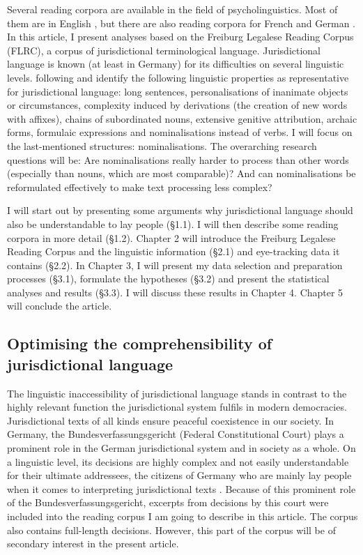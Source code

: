 \documentclass[output=paper]{langsci/langscibook}
\begin{document}
Several reading corpora are available in the field of psycholinguistics. Most of them are in English \citep{Frank2013, Kennedy2003}, but there are also reading corpora for French \citep{Kennedy2003} and German \citep{Kliegl2004, wolfer2013}. In this article, I present analyses based on the Freiburg Legalese Reading Corpus (FLRC), a corpus of jurisdictional terminological language. Jurisdictional language is known (at least in Germany) for its difficulties on several linguistic levels. \citet[170]{HansenSchirra2004} following \citet{Oksaar1988} and \citet{Wagner1981} identify the following linguistic properties as representative for jurisdictional language: long sentences, personalisations of inanimate objects or circumstances, complexity induced by derivations (the creation of new words with affixes), chains of subordinated nouns, extensive genitive attribution, archaic forms, formulaic expressions and nominalisations instead of verbs. I will focus on the last-mentioned structures: nominalisations. The overarching research questions will be: Are nominalisations really harder to process than other words (especially than nouns, which are most comparable)? And can nominalisations be reformulated effectively to make text processing less complex?

I will start out by presenting some arguments why jurisdictional language should also be understandable to lay people (§1.1). I will then describe some reading corpora in more detail (§1.2). Chapter 2 will introduce the Freiburg Legalese Reading Corpus and the linguistic information (§2.1) and eye-tracking data it contains (§2.2). In Chapter 3, I will present my data selection and preparation processes (§3.1), formulate the hypotheses (§3.2) and present the statistical analyses and results (§3.3). I will discuss these results in Chapter 4. Chapter 5 will conclude the article.

\subsection{\label{bkm:Ref283725774}Optimising the comprehensibility of jurisdictional language}

The linguistic inaccessibility of jurisdictional language stands in contrast to the highly relevant function the jurisdictional system fulfils in modern democracies. Jurisdictional texts of all kinds ensure peaceful coexistence in our society. In Germany, the Bundesverfassungsgericht (Federal Constitutional Court) plays a prominent role in the German jurisdictional system and in society as a whole. On a linguistic level, its decisions are highly complex and not easily understandable for their ultimate addressees, the citizens of Germany who are mainly lay people when it comes to interpreting jurisdictional texts \citep[cf. ][]{eichhoff2009denken}. Because of this prominent role of the Bundesverfassungsgericht, excerpts from decisions by this court were included into the reading corpus I am going to describe in this article. The corpus also contains full-length decisions. However, this part of the corpus will be of secondary interest in the present article. 
\end{document}
